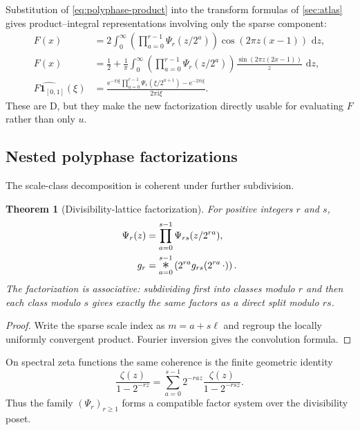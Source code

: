 \documentclass[11pt,oneside]{article}
\numberwithin{equation}{section}
\newtheorem{theorem}{Theorem}[section]
\theoremstyle{definition}
\theoremstyle{remark}
\newcommand{\dd}{\,\mathrm d}
\newcommand{\e}{\mathrm e}
\newcommand{\ii}{\mathrm i}
\newcommand{\bigast}{\mathop{\text{\Large$\ast$}}\limits}
\newcommand{\statusderived}{\textcolor{derivedblue}{\textsf{D}}}
\begin{document}
Substitution of \eqref{eq:polyphase-product} into the transform formulas of
\cref{sec:atlas} gives product--integral representations involving only the
sparse component:
\begin{align}
 F(x)
 &=2\int_0^\infty
   \left(\prod_{a=0}^{r-1}\Psi_r(z/2^a)\right)
   \cos(2\pi z(x-1))\,\dd z,                              \label{eq:F-polyphase-cosine-integral}\\
 F(x)
 &=\frac12+\frac1\pi\int_0^\infty
   \left(\prod_{a=0}^{r-1}\Psi_r(z/2^a)\right)
   \frac{\sin(2\pi z(2x-1))}{z}\,\dd z,                 \label{eq:F-polyphase-CDF-integral}\\
 \widehat{F\mathbf1_{[0,1]}}(\xi)
 &=\frac{\e^{-\pi\ii\xi}
   \prod_{a=0}^{r-1}\Psi_r(\xi/2^{a+1})-
   \e^{-2\pi\ii\xi}}{2\pi\ii\xi}.                   \label{eq:F-polyphase-Fourier}
\end{align}
These are \statusderived, but they make the new factorization directly usable
for evaluating $F$ rather than only $u$.

\subsection{Nested polyphase factorizations}

The scale-class decomposition is coherent under further subdivision.

\begin{theorem}[Divisibility-lattice factorization]
\label{thm:nested-polyphase}
For positive integers $r$ and $s$,
\begin{align}
 \Psi_r(z)
 &=\prod_{a=0}^{s-1}\Psi_{rs}(z/2^{ra}),                  \label{eq:nested-Psi}\\
 g_r
 &=\bigast_{a=0}^{s-1}\left(2^{ra}g_{rs}(2^{ra}\,\cdot)\right). \label{eq:nested-gr}
\end{align}
The factorization is associative: subdividing first into classes modulo $r$
and then each class modulo $s$ gives exactly the same factors as a direct split
modulo $rs$.
\end{theorem}

\begin{proof}
Write the sparse scale index as $m=a+s\ell$ and regroup the locally uniformly
convergent product.  Fourier inversion gives the convolution formula.
\end{proof}

On spectral zeta functions the same coherence is the finite geometric identity
\begin{equation}
 \frac{\zeta(z)}{1-2^{-rz}}
 =\sum_{a=0}^{s-1}2^{-raz}\frac{\zeta(z)}{1-2^{-rsz}}.     \label{eq:nested-zeta}
\end{equation}
Thus the family $(\Psi_r)_{r\ge1}$ forms a compatible factor system over the
divisibility poset.
\end{document}
